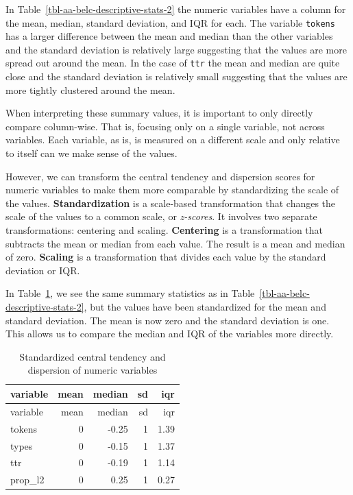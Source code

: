 \documentclass[
  letterpaper,
  DIV=11,
  numbers=noendperiod]{scrreport}
\theoremstyle{definition}
\theoremstyle{remark}
\begin{document}
In Table~\ref{tbl-aa-belc-descriptive-stats-2} the numeric variables
have a column for the mean, median, standard deviation, and IQR for
each. The variable \texttt{tokens} has a larger difference between the
mean and median than the other variables and the standard deviation is
relatively large suggesting that the values are more spread out around
the mean. In the case of \texttt{ttr} the mean and median are quite
close and the standard deviation is relatively small suggesting that the
values are more tightly clustered around the mean.

When interpreting these summary values, it is important to only directly
compare column-wise. That is, focusing only on a single variable, not
across variables. Each variable, as is, is measured on a different scale
and only relative to itself can we make sense of the values.

However, we can transform the central tendency and dispersion scores for
numeric variables to make them more comparable by standardizing the
scale of the values. \textbf{Standardization} is a scale-based
transformation that changes the scale of the values to a common scale,
or \emph{z-scores}. It involves two separate transformations: centering
and scaling. \textbf{Centering} is a transformation that subtracts the
mean or median from each value. The result is a mean and median of zero.
\textbf{Scaling} is a transformation that divides each value by the
standard deviation or IQR.

In Table~\ref{tbl-aa-belc-descriptive-stats-standardized}, we see the
same summary statistics as in
Table~\ref{tbl-aa-belc-descriptive-stats-2}, but the values have been
standardized for the mean and standard deviation. The mean is now zero
and the standard deviation is one. This allows us to compare the median
and IQR of the variables more directly.

\hypertarget{tbl-aa-belc-descriptive-stats-standardized}{}
\begin{longtable}[]{@{}lrrrr@{}}
\caption{\label{tbl-aa-belc-descriptive-stats-standardized}Standardized
central tendency and dispersion of numeric variables}\tabularnewline
\toprule\noalign{}
variable & mean & median & sd & iqr \\
\midrule\noalign{}
\endfirsthead
\toprule\noalign{}
variable & mean & median & sd & iqr \\
\midrule\noalign{}
\endhead
\bottomrule\noalign{}
\endlastfoot
tokens & 0 & -0.25 & 1 & 1.39 \\
types & 0 & -0.15 & 1 & 1.37 \\
ttr & 0 & -0.19 & 1 & 1.14 \\
prop\_l2 & 0 & 0.25 & 1 & 0.27 \\
\end{longtable}
\end{document}
